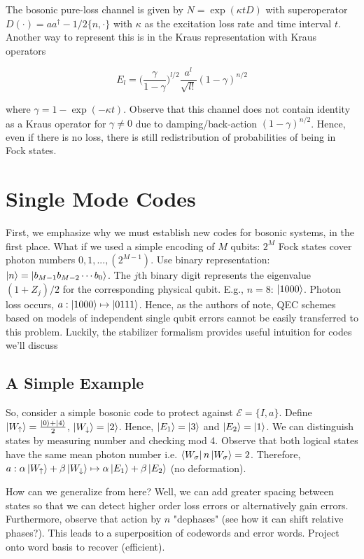 \documentclass[12]{amsart}
\newcommand\0{\mathbf{0}}
\newcommand\<{\langle}
\renewcommand\>{\rangle}
\begin{document}
The bosonic pure-loss channel is given by $N = \exp(\kappa t D)$ with superoperator $D(\cdot) = a a^\dag - 1/2 \{ n , \cdot \}$ with $\kappa$ as the excitation loss rate and time interval $t$\cite{albert2017performance}. Another way to represent this is in the Kraus representation with Kraus operators

$$
E_l = \Big(\frac{\gamma}{1-\gamma}\Big)^{l / 2} \frac{a^l}{\sqrt{l!}}(1 - \gamma)^{n / 2}
$$

where $\gamma = 1 - \exp(- \kappa t)$. Observe that this channel does not contain identity as a Kraus operator for $\gamma \neq 0$ due to damping/back-action $(1-\gamma)^{n / 2}$. Hence, even if there is no loss, there is still redistribution of probabilities of being in Fock states.

\section{Single Mode Codes}

First, we emphasize why we must establish new codes for bosonic systems, in the first place. What if we used a simple encoding of $M$ qubits: $2^M$ Fock states cover photon numbers $0, 1, . . . , (2^{M - 1})$. Use binary representation: $\ket{n} = \ket{b_{M-1} b_{M-2} \cdots b_0 }$. The $j$th binary digit represents the eigenvalue $(1 + Z_j)/2$ for the corresponding physical qubit. E.g., $n=8$: $\ket{1000}$. Photon loss occurs, $a : \ket{1000} \mapsto \ket{0111}$. Hence, as the authors of \cite{michael2016new} note, QEC schemes based on models of independent single qubit errors cannot be easily transferred to this problem. Luckily, the stabilizer formalism provides useful intuition for codes we'll discuss

\subsection{A Simple Example}

So, consider a simple bosonic code to protect against $\mathcal{E} = \{ I, a \}$. Define $\ket{W_\uparrow} = \frac{\ket{0} + \ket{4}}{2}$, $\ket{W_\downarrow} = \ket{2}$. Hence, $\ket{E_1} = \ket{3}$ and $\ket{E_2} = \ket{1}$. We can distinguish states by measuring number and checking mod 4. Observe that both logical states have the same mean photon number i.e. $\bra{W_\sigma} n \ket{W_\sigma} = 2$. Therefore, $a : \alpha\ket{W_\uparrow} + \beta\ket{W_\downarrow} \mapsto \alpha \ket{E_1} + \beta \ket{E_2}$ (no deformation).

How can we generalize from here? Well, we can add greater spacing between states so that we can detect higher order loss errors or alternatively gain errors. Furthermore, observe that action by $n$ "dephases" (see how it can shift relative phases?). This leads to a superposition of codewords and error words. Project onto word basis to recover (efficient).
\end{document}
